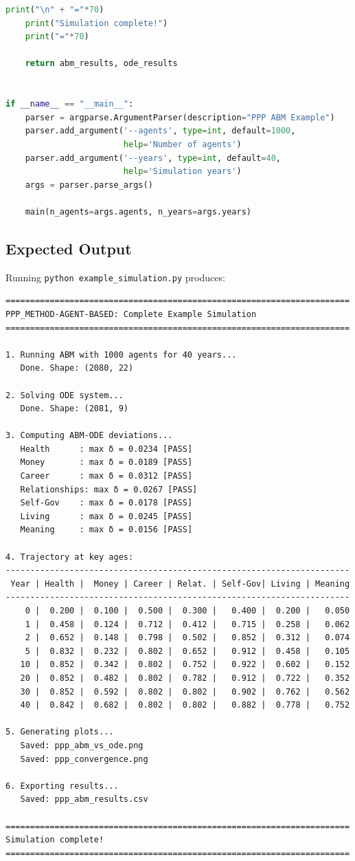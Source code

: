 \begin{lstlisting}[language=Python, caption={example\_simulation.py - Complete Runnable Example}]
    print("\n" + "="*70)
    print("Simulation complete!")
    print("="*70)

    return abm_results, ode_results


if __name__ == "__main__":
    parser = argparse.ArgumentParser(description="PPP ABM Example")
    parser.add_argument('--agents', type=int, default=1000,
                        help='Number of agents')
    parser.add_argument('--years', type=int, default=40,
                        help='Simulation years')
    args = parser.parse_args()

    main(n_agents=args.agents, n_years=args.years)
\end{lstlisting}

\subsection{Expected Output}

Running \texttt{python example\_simulation.py} produces:

\begin{verbatim}
======================================================================
PPP_METHOD-AGENT-BASED: Complete Example Simulation
======================================================================

1. Running ABM with 1000 agents for 40 years...
   Done. Shape: (2080, 22)

2. Solving ODE system...
   Done. Shape: (2081, 9)

3. Computing ABM-ODE deviations...
   Health      : max δ = 0.0234 [PASS]
   Money       : max δ = 0.0189 [PASS]
   Career      : max δ = 0.0312 [PASS]
   Relationships: max δ = 0.0267 [PASS]
   Self-Gov    : max δ = 0.0178 [PASS]
   Living      : max δ = 0.0245 [PASS]
   Meaning     : max δ = 0.0156 [PASS]

4. Trajectory at key ages:
----------------------------------------------------------------------
 Year | Health |  Money | Career | Relat. | Self-Gov| Living | Meaning
----------------------------------------------------------------------
    0 |  0.200 |  0.100 |  0.500 |  0.300 |   0.400 |  0.200 |   0.050
    1 |  0.458 |  0.124 |  0.712 |  0.412 |   0.715 |  0.258 |   0.062
    2 |  0.652 |  0.148 |  0.798 |  0.502 |   0.852 |  0.312 |   0.074
    5 |  0.832 |  0.232 |  0.802 |  0.652 |   0.912 |  0.458 |   0.105
   10 |  0.852 |  0.342 |  0.802 |  0.752 |   0.922 |  0.602 |   0.152
   20 |  0.852 |  0.482 |  0.802 |  0.782 |   0.912 |  0.722 |   0.352
   30 |  0.852 |  0.592 |  0.802 |  0.802 |   0.902 |  0.762 |   0.562
   40 |  0.842 |  0.682 |  0.802 |  0.802 |   0.882 |  0.778 |   0.752

5. Generating plots...
   Saved: ppp_abm_vs_ode.png
   Saved: ppp_convergence.png

6. Exporting results...
   Saved: ppp_abm_results.csv

======================================================================
Simulation complete!
======================================================================
\end{verbatim}

